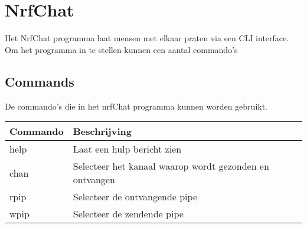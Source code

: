 \section{NrfChat}

Het NrfChat programma laat mensen met elkaar praten via een CLI interface. Om het programma in te stellen kunnen een aantal commando's

\subsection{Commands}
De commando's die in het nrfChat programma kunnen worden gebruikt.

\begin{table}[h]
    \begin{tabular}{|l|l|} \hline
        Commando & Beschrijving \\\hline
        help & Laat een hulp bericht zien \\\hline
        chan & Selecteer het kanaal waarop wordt gezonden en ontvangen\\\hline
        rpip & Selecteer de ontvangende pipe \\\hline
        wpip & Selecteer de zendende pipe \\\hline
    \end{tabular}
\end{table}